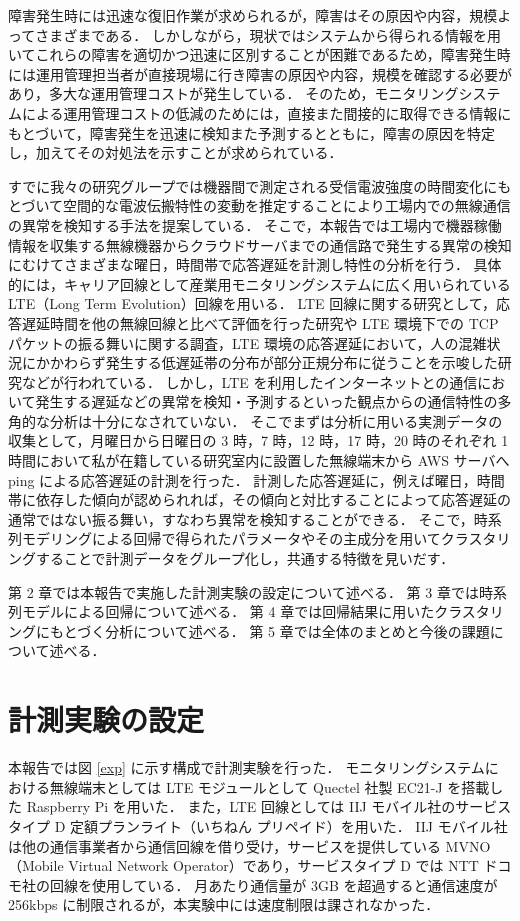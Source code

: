 \documentclass[technicalreport]{ieicej}
\begin{document}
障害発生時には迅速な復旧作業が求められるが，障害はその原因や内容，規模よってさまざまである．
しかしながら，現状ではシステムから得られる情報を用いてこれらの障害を適切かつ迅速に区別することが困難であるため，障害発生時には運用管理担当者が直接現場に行き障害の原因や内容，規模を確認する必要があり，多大な運用管理コストが発生している．
そのため，モニタリングシステムによる運用管理コストの低減のためには，直接また間接的に取得できる情報にもとづいて，障害発生を迅速に検知また予測するとともに，障害の原因を特定し，加えてその対処法を示すことが求められている．

すでに我々の研究グループでは機器間で測定される受信電波強度の時間変化にもとづいて空間的な電波伝搬特性の変動を推定することにより工場内での無線通信の異常を検知する手法を提案している\cite{prev}．
そこで，本報告では工場内で機器稼働情報を収集する無線機器からクラウドサーバまでの通信路で発生する異常の検知にむけてさまざまな曜日，時間帯で応答遅延を計測し特性の分析を行う．
具体的には，キャリア回線として産業用モニタリングシステムに広く用いられている LTE（Long Term Evolution）回線を用いる．
LTE 回線に関する研究として，応答遅延時間を他の無線回線と比べて評価を行った研究\cite{lte1}\cite{lte2}や LTE 環境下での TCP パケットの振る舞いに関する調査\cite{tcp}，LTE 環境の応答遅延において，人の混雑状況にかかわらず発生する低遅延帯の分布が部分正規分布に従うことを示唆した研究\cite{distribution}などが行われている．
しかし，LTE を利用したインターネットとの通信において発生する遅延などの異常を検知・予測するといった観点からの通信特性の多角的な分析は十分になされていない．
そこでまずは分析に用いる実測データの収集として，月曜日から日曜日の 3 時，7 時，12 時，17 時，20 時のそれぞれ 1 時間において私が在籍している研究室内に設置した無線端末から AWS サーバへ ping による応答遅延の計測を行った．
計測した応答遅延に，例えば曜日，時間帯に依存した傾向が認められれば，その傾向と対比することによって応答遅延の通常ではない振る舞い，すなわち異常を検知することができる．
そこで，時系列モデリングによる回帰で得られたパラメータやその主成分を用いてクラスタリングすることで計測データをグループ化し，共通する特徴を見いだす．

第 2 章では本報告で実施した計測実験の設定について述べる．
第 3 章では時系列モデルによる回帰について述べる．
第 4 章では回帰結果に用いたクラスタリングにもとづく分析について述べる．
第 5 章では全体のまとめと今後の課題について述べる．
\section{計測実験の設定}
本報告では図 \ref{exp} に示す構成で計測実験を行った．
モニタリングシステムにおける無線端末としては LTE モジュールとして Quectel 社製 EC21-J を搭載した Raspberry Pi を用いた．
また，LTE 回線としては IIJ モバイル社のサービスタイプ D 定額プランライト（いちねん プリペイド）を用いた．
IIJ モバイル社は他の通信事業者から通信回線を借り受け，サービスを提供している MVNO（Mobile Virtual Network Operator）であり，サービスタイプ D では NTT ドコモ社の回線を使用している．
月あたり通信量が 3GB を超過すると通信速度が 256kbps に制限されるが，本実験中には速度制限は課されなかった．
\end{document}
